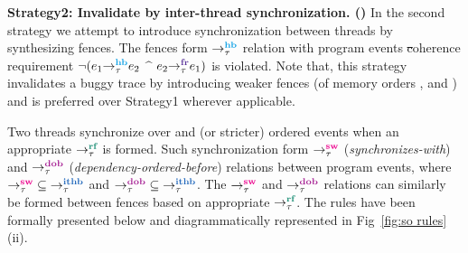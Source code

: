 \noindent
{\bf Strategy2: Invalidate by inter-thread synchronization.
(\wfence)}\newline
In the second strategy we attempt to introduce synchronization
between threads by synthesizing fences. The fences form
$\setHB$ relation with program events \st coherence
requirement
$\neg(\hb{\tau}{e_1}{e_2}$ $\^$ $\fr{\tau}{e_2}{e_1})$ is
violated.
%
Note that, this strategy invalidates a buggy trace by introducing 
weaker fences (of memory orders \rel, \acq and \acqrel) and 
is preferred over Strategy1 wherever applicable.

Two threads synchronize over \rel and \acq (or stricter) ordered
events when an appropriate $\setRF$ is formed. Such synchronization
form $\setSW$ ({\it synchronizes-with}) and $\setDOB$ 
({\it dependency-ordered-before}) relations between program events,
\cite{Batty-POPL12}\cite{C11}
where $\setSW \subseteq \setITHB$ and $\setDOB \subseteq \setITHB$.
%
The $\setSW$ and $\setDOB$ relations can similarly be formed between
fences based on appropriate $\setRF$. 
The rules have been formally presented 
below and diagrammatically represented in Fig~\ref{fig:so rules}(ii).

